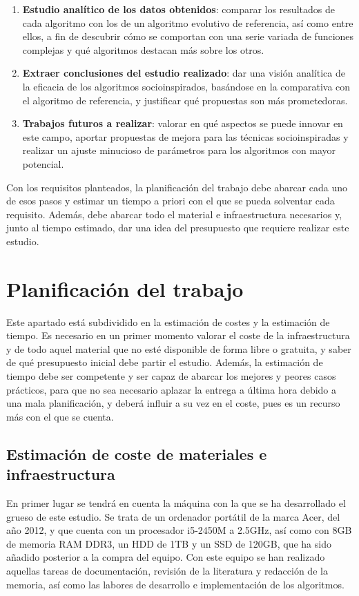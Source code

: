 \begin{enumerate}
	\item{\textbf{Estudio analítico de los datos obtenidos}: comparar los resultados de cada algoritmo con los de un algoritmo evolutivo de referencia, así como entre ellos, a fin de descubrir cómo se comportan con una serie variada de funciones complejas y qué algoritmos destacan más sobre los otros.}
	\item{\textbf{Extraer conclusiones del estudio realizado}: dar una visión analítica de la eficacia de los algoritmos socioinspirados, basándose en la comparativa con el algoritmo de referencia, y justificar qué propuestas son más prometedoras.}
	\item{\textbf{Trabajos futuros a realizar}: valorar en qué aspectos se puede innovar en este campo, aportar propuestas de mejora para las técnicas socioinspiradas y realizar un ajuste minucioso de parámetros para los algoritmos con mayor potencial.}
\end{enumerate}

Con los requisitos planteados, la planificación del trabajo debe abarcar cada uno de esos pasos y estimar un tiempo a priori con el que se pueda solventar cada requisito. Además, debe abarcar todo el material e infraestructura necesarios y, junto al tiempo estimado, dar una idea del presupuesto que requiere realizar este estudio.

\section{Planificación del trabajo}

Este apartado está subdividido en la estimación de costes y la estimación de tiempo. Es necesario en un primer momento valorar el coste de la infraestructura y de todo aquel material que no esté disponible de forma libre o gratuita, y saber de qué presupuesto inicial debe partir el estudio. Además, la estimación de tiempo debe ser competente y ser capaz de abarcar los mejores y peores casos prácticos, para que no sea necesario aplazar la entrega a última hora debido a una mala planificación, y deberá influir a su vez en el coste, pues es un recurso más con el que se cuenta.

\subsection{Estimación de coste de materiales e infraestructura}

En primer lugar se tendrá en cuenta la máquina con la que se ha desarrollado el grueso de este estudio. Se trata de un ordenador portátil de la marca Acer, del año 2012, y que cuenta con un procesador i5-2450M a 2.5GHz, así como con 8GB de memoria RAM DDR3, un HDD de 1TB y un SSD de 120GB, que ha sido añadido posterior a la compra del equipo. Con este equipo se han realizado aquellas tareas de documentación, revisión de la literatura y redacción de la memoria, así como las labores de desarrollo e implementación de los algoritmos.

